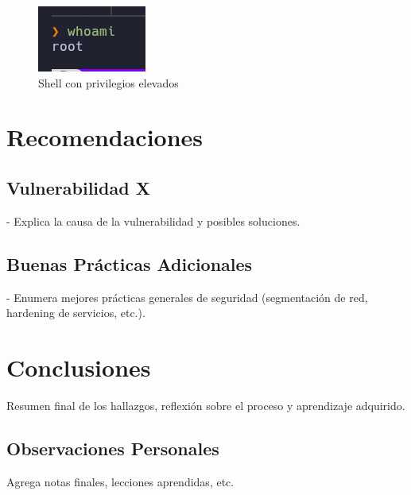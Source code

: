 \documentclass[12pt,a4paper]{report}
\begin{document}
\begin{figure}[H]
    \centering
    \includegraphics[width=0.7\linewidth]{images/placeholder_root.png}
    \caption{Shell con privilegios elevados}
    \label{fig:root-shell}
\end{figure}

\chapter{Recomendaciones}

\section{Vulnerabilidad X}
- Explica la causa de la vulnerabilidad y posibles soluciones.

\section{Buenas Prácticas Adicionales}
- Enumera mejores prácticas generales de seguridad (segmentación de red, hardening de servicios, etc.).

\chapter{Conclusiones}

Resumen final de los hallazgos, reflexión sobre el proceso y aprendizaje adquirido.

\section{Observaciones Personales}
Agrega notas finales, lecciones aprendidas, etc.

\end{document}
